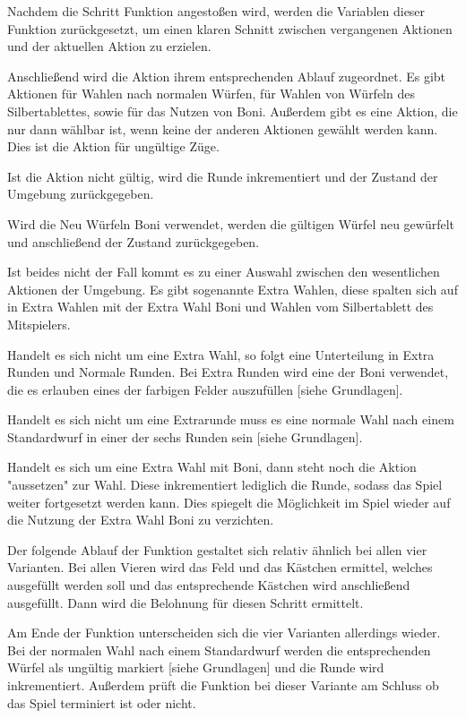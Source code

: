 Nachdem die Schritt Funktion angestoßen wird, werden die Variablen dieser Funktion zurückgesetzt, um einen klaren Schnitt zwischen vergangenen Aktionen und der aktuellen Aktion zu erzielen.

Anschließend wird die Aktion ihrem entsprechenden Ablauf zugeordnet. Es gibt Aktionen für Wahlen nach normalen Würfen, für Wahlen von Würfeln des Silbertablettes, sowie für das Nutzen von Boni. Außerdem gibt es eine Aktion, die nur dann wählbar ist, wenn keine der anderen Aktionen gewählt werden kann. Dies ist die Aktion für ungültige Züge.

Ist die Aktion nicht gültig, wird die Runde inkrementiert und der Zustand der Umgebung zurückgegeben.

Wird die Neu Würfeln Boni verwendet, werden die gültigen Würfel neu gewürfelt und anschließend der Zustand zurückgegeben.

Ist beides nicht der Fall kommt es zu einer Auswahl zwischen den wesentlichen Aktionen der Umgebung. Es gibt sogenannte Extra Wahlen, diese spalten sich auf in Extra Wahlen mit der Extra Wahl Boni und Wahlen vom Silbertablett des Mitspielers.

Handelt es sich nicht um eine Extra Wahl, so folgt eine Unterteilung in Extra Runden und Normale Runden. Bei Extra Runden wird eine der Boni verwendet, die es erlauben eines der farbigen Felder auszufüllen [siehe Grundlagen].

Handelt es sich nicht um eine Extrarunde muss es eine normale Wahl nach einem Standardwurf in einer der sechs Runden sein [siehe Grundlagen].

Handelt es sich um eine Extra Wahl mit Boni, dann steht noch die Aktion "aussetzen" zur Wahl. Diese inkrementiert lediglich die Runde, sodass das Spiel weiter fortgesetzt werden kann. Dies spiegelt die Möglichkeit im Spiel wieder auf die Nutzung der Extra Wahl Boni zu verzichten.

Der folgende Ablauf der Funktion gestaltet sich relativ ähnlich bei allen vier Varianten. Bei allen Vieren wird das Feld und das Kästchen ermittel, welches ausgefüllt werden soll und das entsprechende Kästchen wird anschließend ausgefüllt. Dann wird die Belohnung für diesen Schritt ermittelt.

Am Ende der Funktion unterscheiden sich die vier Varianten allerdings wieder. Bei der normalen Wahl nach einem Standardwurf werden die entsprechenden Würfel als ungültig markiert [siehe Grundlagen] und die Runde wird inkrementiert. Außerdem prüft die Funktion bei dieser Variante am Schluss ob das Spiel terminiert ist oder nicht.

